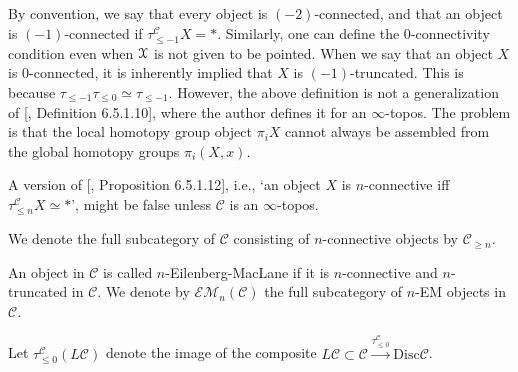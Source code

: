 \begin{rem}
 By convention, we say that every object is $(-2)$-connected, and that an object is $(-1)$-connected if $\tau_{\leq -1}^\mathcal{C}X=*$. Similarly, one can define the $0$-connectivity condition even when $\EuScript{X}$ is not given to be pointed. When we say that an object $X$ is $0$-connected, it is inherently implied that $X$ is $(-1)$-truncated. This is because $\tau_{\leq -1}\tau_{\leq 0}\simeq \tau_{\leq -1}$. However, the above definition is not a generalization of [\cite{lurie2009higher}, Definition 6.5.1.10], where the author defines it for an $\infty$-topos. The problem is that the local homotopy group object $\pi_iX$ cannot always be assembled from the global homotopy groups $\pi_i(X,x)$.
\end{rem}
\begin{rem}
    A version of [\cite{lurie2009higher}, Proposition 6.5.1.12], i.e., `an object $X$ is $n$-connective iff $\tau_{\leq n}^\mathcal{C}X\simeq *$', might be false unless $\mathcal{C}$ is an $\infty$-topos.
\end{rem}


We denote the full subcategory of $\mathcal{C}$ consisting of $n$-connective objects by $\mathcal{C}_{\geq n}$.  
\begin{defn}
An object in $\mathcal{C}$ is called $n$-Eilenberg-MacLane if it is $n$-connective and $n$-truncated in $\mathcal{C}$. We denote by $\mathcal{EM}_n(\mathcal{C})$ the full subcategory of $n$-EM objects in $\mathcal{C}$. 
\end{defn}
Let $\tau_{\leq 0}^\mathcal{C}(L\mathcal{C}) $ denote the image of the composite $L\mathcal{C}\subset \mathcal{C}\xrightarrow[]{\tau_{\leq 0}^\mathcal{C}}\text{Disc}\mathcal{C}$.


